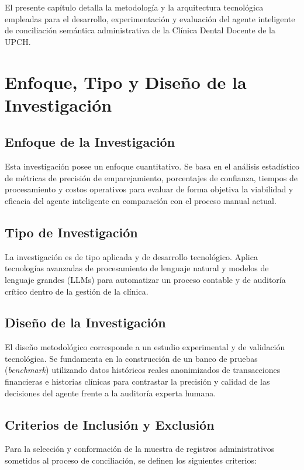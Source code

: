 \label{ch:metodologia}
El presente capítulo detalla la metodología y la arquitectura tecnológica empleadas para el desarrollo, experimentación y evaluación del agente inteligente de conciliación semántica administrativa de la Clínica Dental Docente de la UPCH.

\section{Enfoque, Tipo y Diseño de la Investigación}

\subsection{Enfoque de la Investigación}
Esta investigación posee un enfoque cuantitativo. Se basa en el análisis estadístico de métricas de precisión de emparejamiento, porcentajes de confianza, tiempos de procesamiento y costos operativos para evaluar de forma objetiva la viabilidad y eficacia del agente inteligente en comparación con el proceso manual actual.

\subsection{Tipo de Investigación}
La investigación es de tipo aplicada y de desarrollo tecnológico. Aplica tecnologías avanzadas de procesamiento de lenguaje natural y modelos de lenguaje grandes (LLMs) para automatizar un proceso contable y de auditoría crítico dentro de la gestión de la clínica.

\subsection{Diseño de la Investigación}
El diseño metodológico corresponde a un estudio experimental y de validación tecnológica. Se fundamenta en la construcción de un banco de pruebas (\textit{benchmark}) utilizando datos históricos reales anonimizados de transacciones financieras e historias clínicas para contrastar la precisión y calidad de las decisiones del agente frente a la auditoría experta humana.

\subsection{Criterios de Inclusión y Exclusión}
Para la selección y conformación de la muestra de registros administrativos sometidos al proceso de conciliación, se definen los siguientes criterios:

